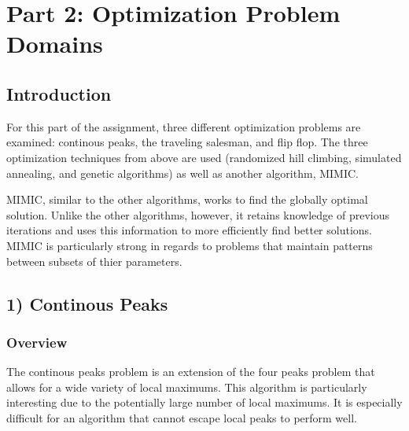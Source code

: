 \documentclass[h]{article}
\begin{document}
\section*{Part 2: Optimization Problem Domains}
\subsection*{ Introduction}  
For this part of the assignment, three different optimization problems are 
examined: continous peaks, the traveling salesman, and flip flop.  The three
optimization techniques from above are used (randomized hill climbing, simulated annealing, and genetic algorithms) 
as well as another algorithm, MIMIC.

MIMIC, similar to the other algorithms, works to find the globally optimal 
solution.  Unlike the other algorithms, however, it retains knowledge of previous 
iterations and uses this information to more efficiently find better solutions.  MIMIC is particularly strong in regards to 
problems that maintain patterns between subsets of thier parameters.

\subsection*{1) Continous Peaks}  
\subsubsection*{Overview}
The continous peaks problem is an extension of the four peaks problem that 
allows for a wide variety of local maximums.  This algorithm is particularly interesting due to the potentially large 
number of local maximums.  It is especially difficult for an algorithm that cannot escape 
local peaks to perform well.
\end{document}
